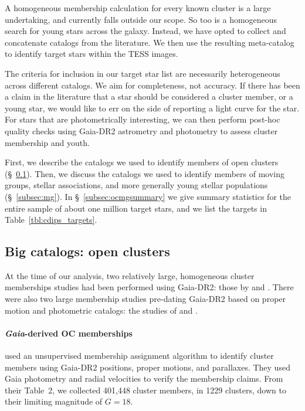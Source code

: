 \documentclass[12pt,twocolumn,tighten,trackchanges]{aastex62}
\begin{document}
A homogeneous membership calculation for every known cluster is a
large undertaking, and currently falls outside our scope.  So too is a
homogeneous search for young stars across the galaxy.  Instead, we
have opted to collect and concatenate catalogs from the literature.
We then use the resulting meta-catalog to identify target stars within
the TESS images.

The criteria for inclusion in our target star list are necessarily
heterogeneous across different catalogs.  We aim for completeness, not
accuracy.  If there has been a claim in the literature that a star
should be considered a cluster member, or a young star, we would like
to err on the side of reporting a light curve for the star.  For stars
that are photometrically interesting, we can then perform post-hoc
quality checks using Gaia-DR2 astrometry and photometry to assess
cluster membership and youth.

First, we describe the catalogs we used to identify members of open
clusters (\S~\ref{subsec:oc}).  Then, we discuss the catalogs we used
to identify members of moving groups, stellar associations, and more
generally young stellar populations (\S~\ref{subsec:mg}).  In
\S~\ref{subsec:ocmgsummary} we give
summary statistics for the entire sample of about one million target
stars, and we list the targets in Table~\ref{tbl:cdips_targets}.

\subsection{Big catalogs: open clusters}
\label{subsec:oc}

At the time of our analysis, two relatively large, homogeneous cluster
memberships studies had been performed using Gaia-DR2: those by
\citet{cantat-gaudin_gaia_2018} and \citet{gaia_hr_2018}.  There were
also two large membership studies pre-dating Gaia-DR2 based on proper
motion and photometric catalogs: the studies of
\citet{Kharchenko_et_al_2013} and \citet{dias_proper_2014}.

\paragraph{{\it Gaia}-derived OC memberships}

\citet{cantat-gaudin_gaia_2018} used an unsupervised membership
assignment algorithm \citep{krone-martins_upmask_2014} to identify
cluster members using Gaia-DR2 positions, proper motions, and
parallaxes.  They used Gaia photometry and radial velocities to verify
the membership claims.  From their Table~2, we collected 401{,}448
cluster members, in 1229 clusters, down to their limiting magnitude of
$G=18$.
\end{document}
